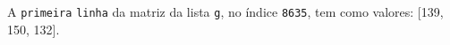\documentclass[12pt,varwidth=16cm,border=1pt]{standalone}
\begin{document}
A \verb+primeira+ \verb+linha+ da matriz da lista \verb+g+, no índice \verb+8635+, tem como valores: [139, 150, 132].

\questiomfalse
\end{document}
